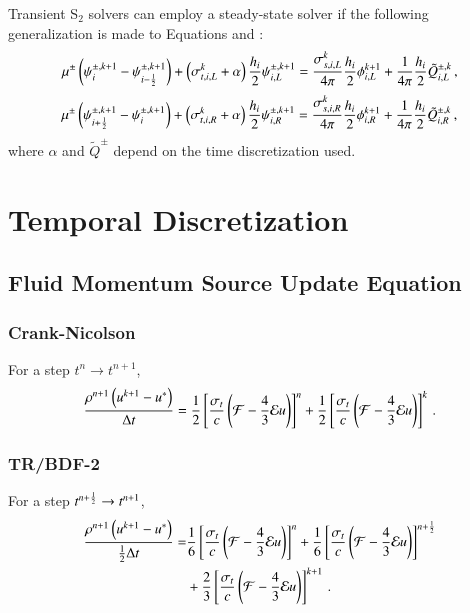 \documentclass[preprint,12pt]{elsarticle}
\begin{document}
Transient S$_2$ solvers can employ a steady-state solver if
the following generalization is made to Equations 
and :
\begin{equation}
  \mu^\pm\fn{\psi^{\pm,k+1}_i - \psi^{\pm,k+1}_{i-\half}}
  +\fn{\sigma_{t,i,L}^k + \alpha}\frac{h_i}{2}\psi\iL^{\pm,k+1}=
  \frac{\sigma_{s,i,L}^k}{4\pi}\frac{h_i}{2}\phi\iL^{k+1}
  +\frac{1}{4\pi}\frac{h_i}{2}\tilde{Q}_{i,L}^{\pm,k} \pec
\lequ{S2trL}
\end{equation}
\begin{equation}
  \mu^\pm\fn{\psi^{\pm,k+1}_{i+\half} - \psi^{\pm,k+1}_i}
  +\fn{\sigma_{t,i,R}^k + \alpha}\frac{h_i}{2}\psi\iR^{\pm,k+1}=
  \frac{\sigma_{s,i,R}^k}{4\pi}\frac{h_i}{2}\phi\iR^{k+1}
  +\frac{1}{4\pi}\frac{h_i}{2}\tilde{Q}_{i,R}^{\pm,k} \pec
\lequ{S2trR}
\end{equation}
where $\alpha$ and $\tilde{Q}^\pm$ depend on the time discretization used.

\section{Temporal Discretization}
\subsection{Fluid Momentum Source Update Equation}
\subsubsection{Crank-Nicolson}
For a step $t^n\rightarrow t^{n+1}$,
\begin{equation}
  \frac{\rho^{n+1}\left(u^{k+1}-u^*\right)}{\Delta t} = 
   \frac{1}{2}\left[\frac{\sigma_{t}}{c}\left(\mathcal{F}-\frac{4}{3}\mathcal{E} u\right)\right]^n
  +\frac{1}{2}\left[\frac{\sigma_{t}}{c}\left(\mathcal{F}-\frac{4}{3}\mathcal{E} u\right)\right]^k
  \, .
\end{equation}

\subsubsection{TR/BDF-2}
For a step $t^{n+\frac{1}{2}}\rightarrow t^{n+1}$,
\begin{equation}\begin{split}
  \frac{\rho^{n+1}\left(u^{k+1}-u^*\right)}{\frac{1}{2}\Delta t} =  
  & \frac{1}{6}\left[\frac{\sigma_{t}}{c}\left(\mathcal{F}-\frac{4}{3}\mathcal{E} u\right)\right]^n
   +\frac{1}{6}\left[\frac{\sigma_{t}}{c}\left(\mathcal{F}-\frac{4}{3}\mathcal{E} u\right)\right]^{n+\frac{1}{2}}\\
  &+\frac{2}{3}\left[\frac{\sigma_{t}}{c}\left(\mathcal{F}-\frac{4}{3}\mathcal{E} u\right)\right]^{k+1}
  \, .
\end{split}\end{equation}
\end{document}
